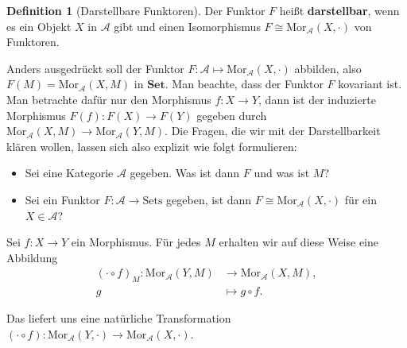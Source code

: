 \documentclass[leqno]{article}
\theoremstyle{plain}
\theoremstyle{definition}
\newtheorem{defn}{Definition}[section]
\theoremstyle{remark}
\begin{document}
\begin{defn}[Darstellbare Funktoren]
Der Funktor $F$ heißt \textbf{darstellbar}, wenn es ein Objekt $X$ in $\mathcal{A}$ gibt und einen Isomorphismus $F \cong \text{Mor}_{\mathcal{A}}(X,\cdot)$ von Funktoren.
\end{defn}

Anders ausgedrückt soll der Funktor $F: \mathcal{A} \mapsto \text{Mor}_\mathcal{A}(X,\cdot)$ abbilden, also $F(M) = \text{Mor}_\mathcal{A}(X,M)$ in $\textbf{Set}$. Man beachte, dass der Funktor $F$ kovariant ist. Man betrachte dafür nur den Morphismus $f: X \rightarrow Y$, dann ist der induzierte Morphismus $F(f): F(X) \rightarrow F(Y)$ gegeben durch $\text{Mor}_{\mathcal{A}}(X,M) \rightarrow \text{Mor}_{\mathcal{A}}(Y,M)$. Die Fragen, die wir mit der Darstellbarkeit klären wollen, lassen sich also explizit wie folgt formulieren:

\begin{itemize}
	\item Sei eine Kategorie $\mathcal{A}$ gegeben. Was ist dann $F$ und was ist $M$?
	\item Sei ein Funktor $F: \mathcal{A} \rightarrow \text{Sets}$ gegeben, ist dann $F \cong \text{Mor}_{\mathcal{A}}(X,\cdot)$ für ein $X \in \mathcal{A}$?
\end{itemize}

Sei $f: X \rightarrow Y$ ein Morphismus. Für jedes $M$ erhalten wir auf diese Weise eine Abbildung
\begin{align}
(\cdot \circ f)_M: \text{Mor}_{\mathcal{A}}(Y,M) &\rightarrow \text{Mor}_{\mathcal{A}}(X,M), \\
g &\mapsto g \circ f.
\end{align}

Das liefert uns eine natürliche Transformation $(\cdot \circ f): \text{Mor}_{\mathcal{A}}(Y,\cdot) \rightarrow \text{Mor}_{\mathcal{A}}(X,\cdot)$.
\end{document}
